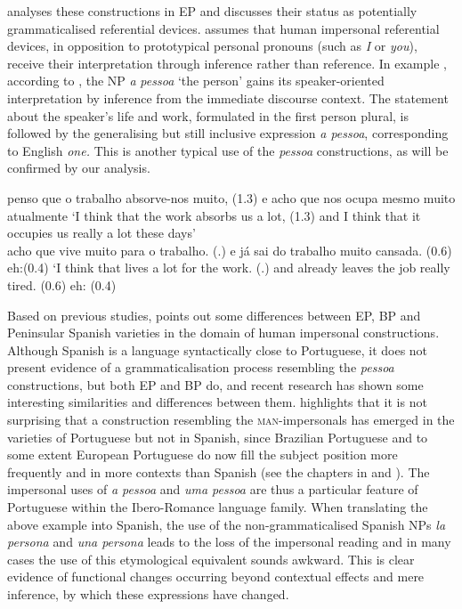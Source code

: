 \documentclass[output=paper]{langscibook}
\begin{document}
{\citet{Posio2021} analyses these constructions in EP and discusses their status as potentially grammaticalised referential devices. \citet[3]{Posio2021} assumes that human impersonal referential devices, in opposition to prototypical personal pronouns (such as} {\textit{I}} {or} {\textit{you}}{), receive their interpretation through inference rather than reference. In example , according to \citet[11]{Posio2021}, the NP} {\textit{a}} {\textit{pessoa} }{‘the person’}{ }{gains its speaker-oriented interpretation by inference from the immediate discourse context. The statement about the speaker’s life and work, formulated in the first person plural, is followed by the generalising but still inclusive expression} {\textit{a pessoa}}{, corresponding to English} {\textit{one.}} {This is another typical use of the} {\textit{pessoa}} {constructions, as will be confirmed by our analysis.}


\ea\label{ex:amaral:1} 
 penso que o trabalho absorve-nos muito, (1.3) e acho que nos ocupa mesmo muito atualmente
 \glt ‘I think that the work absorbs us a lot, (1.3) and I think that it occupies us really a lot these days’\\
 acho que {} vive muito para o trabalho. (.) e já sai do trabalho muito cansada. (0.6) {eh:}{(0.4)}
 \glt ‘I think that  lives a lot for the work. (.) and already leaves the job really tired. (0.6) eh: (0.4) \citep[11]{Posio2021}
\z 
    

{Based on previous studies, \citet{Posio2017,Posio2021} points out some differences between EP, BP and Peninsular Spanish varieties in the domain of human impersonal constructions. Although Spanish is a language syntactically close to Portuguese, it does not present evidence of a grammaticalisation process resembling the} {\textit{pessoa} }{constructions, but both EP and BP do, and recent research has shown some interesting similarities and differences between them. \citet{Posio2021} highlights that it is not surprising that a construction resembling the} \textsc{man}-im\-per\-son\-als has emerged in the varieties of Portuguese but not in Spanish, since Brazilian Portuguese and to some extent European Portuguese \citep[346]{Posio2012} do now fill the subject position more frequently and in more contexts than Spanish (see the chapters in \citealt{KatoNegrão2000} and \citealt{LamogliaDuarte2000}). The impersonal uses of {\textit{a pessoa}} {and} {\textit{uma pessoa} }{are thus a particular feature of Portuguese within the Ibero-Romance language family. When translating the above example into Spanish, the use of the non-grammaticalised Spanish NPs} {\textit{la persona}} {and} {\textit{una persona}} leads to the loss of the impersonal reading and in many cases the use of this etymological equivalent sounds awkward. This is clear evidence of functional changes occurring beyond contextual effects and mere inference, by which these expressions have changed. 
\end{document}
